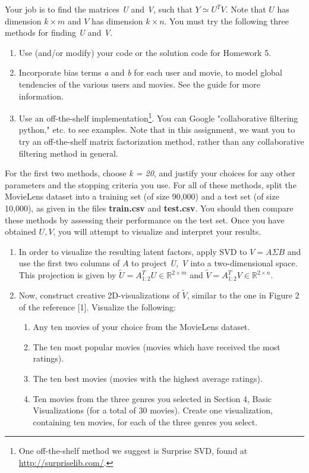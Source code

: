 Your job is to find the matrices \textit{U} and \textit{V}, such that ${Y}\simeq{U^TV}$. Note that $U$ has dimension $k \times m$ and $V$ has dimension $k \times n$. You must try the following three methods for finding \textit{U} and \textit{V}.

\begin{enumerate}
	\item Use (and/or modify) your code or the solution code for Homework 5.
	\item Incorporate bias terms \textit{a} and \textit{b} for each user and movie, to model global tendencies of the various users and movies. See the guide for more information.
	\item Use an off-the-shelf implementation\footnote{One off-the-shelf method we suggest is Surprise SVD, found at \url{http://surpriselib.com/}.}. You can Google "collaborative filtering python,"  etc. to see examples. Note that in this assignment, we want you to try an off-the-shelf matrix factorization method, rather than any collaborative filtering method in general.
\end{enumerate}

For the first two methods, choose \textit{k = 20}, and justify your choices for any other parameters and the stopping criteria you use. For all of these methods, split the MovieLens dataset into a training set (of size 90,000) and a test set (of size 10,000), as given in the files \textbf{train.csv} and \textbf{test.csv}. You should then compare these methods by assessing their performance on the test set. Once you have obtained $U,V$, you will attempt to visualize and interpret your results.

\begin{enumerate}
	\item In order to visualize the resulting latent factors, apply SVD to $V = A \Sigma B$ and use the first two columns of $A$ to project \textit{U, V} into a two-dimensional space. This projection is given by $\tilde{U} = A_{1:2}^TU \in \mathbb{R}^{2 \times m}$ and $\tilde{V} = A_{1:2}^TV \in \mathbb{R}^{2 \times n}$.
	\item Now, construct creative 2D-visualizations of $\tilde{V}$, similar to the one in Figure 2 of the reference [1]. Visualize the following:		\begin{enumerate}
		\item Any ten movies of your choice from the MovieLens dataset.
		\item The ten most popular movies (movies which have received the most ratings).
		\item The ten best movies (movies with the highest average ratings).
		\item Ten movies from the three genres you selected in Section 4, Basic Visualizations (for a total of 30 movies). Create one visualization, containing ten movies, for each of the three genres you select.
	\end{enumerate}
\end{enumerate}

